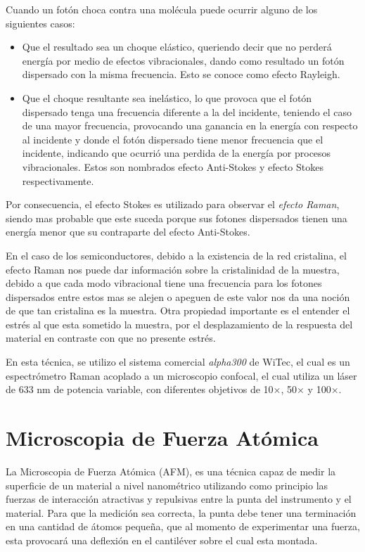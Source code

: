 Cuando un fotón choca contra una molécula puede ocurrir alguno de los siguientes casos:
    \begin{itemize}
        \item Que el resultado sea un choque elástico, queriendo decir que no perderá energía por medio de efectos vibracionales, dando como resultado un fotón dispersado con la misma frecuencia. Esto se conoce como efecto Rayleigh.

        \item Que el choque resultante sea inelástico, lo que provoca que el fotón dispersado tenga una frecuencia diferente a la del incidente, teniendo el caso de una mayor frecuencia, provocando una ganancia en la energía con respecto al incidente y donde el fotón dispersado tiene menor frecuencia que el incidente, indicando que ocurrió una perdida de la energía por procesos vibracionales. Estos son nombrados efecto Anti-Stokes y efecto Stokes respectivamente.
    \end{itemize}

Por consecuencia, el efecto Stokes es utilizado para observar el \textit{efecto Raman}, siendo mas probable que este suceda porque sus fotones dispersados tienen una energía menor que su contraparte del efecto Anti-Stokes.

En el caso de los semiconductores, debido a la existencia de la red cristalina, el efecto Raman nos puede dar información sobre la cristalinidad de la muestra, debido a que cada modo vibracional tiene una frecuencia para los fotones dispersados entre estos mas se alejen o apeguen de este valor nos da una noción de que tan cristalina es la muestra\cite{Nassar2016, Qiu2021}. Otra propiedad importante es el entender el estrés al que esta sometido la muestra, por el desplazamiento de la respuesta del material en contraste con que no presente estrés\cite{Weber2000}.

En esta técnica, se utilizo el sistema comercial \textit{alpha300} de WiTec, el cual es un espectrómetro Raman acoplado a un microscopio confocal, el cual utiliza un láser de 633 nm de potencia variable, con diferentes objetivos de 10$\times$, 50$\times$ y 100$\times$.

\section{Microscopia de Fuerza Atómica}
\label{sec:chap3-afm}
La Microscopia de Fuerza Atómica (AFM), es una técnica capaz de medir la superficie de un material a nivel nanométrico utilizando como principio las fuerzas de interacción atractivas y repulsivas entre la punta del instrumento y el material. Para que la medición sea correcta, la punta debe tener una terminación en una cantidad de átomos pequeña, que al momento de experimentar una fuerza, esta provocará una deflexión en el cantiléver sobre el cual esta 
montada\cite{Binnig1986}.

